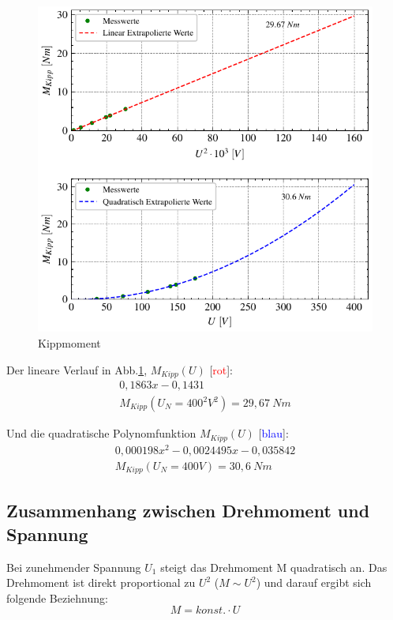 \documentclass[conference]{IEEEtran}
\begin{document}
\begin{figure}[htbp]
    \centering
    \includegraphics[width=\columnwidth]{./figures/kippmoment.pdf}
    \caption{Kippmoment}
    \label{fig:Kippmoment}
\end{figure}

Der lineare Verlauf in Abb.\ref{fig:Kippmoment}, $M_{\textit{Kipp}}(U)$ [\textcolor{red}{rot}]:
\begin{gather*}
    0,1863 x - 0,1431\\
    M_{Kipp}(U_N=400^2V^2)=29,67 \ \si{Nm}
\end{gather*}

Und die quadratische Polynomfunktion $M_{\textit{Kipp}}(U)$ [\textcolor{blue}{blau}]:
\begin{gather*}
    0,000198 x^2 - 0,0024495 x -0,035842\\
    M_{Kipp}(U_N=400V)=30,6\ \si{Nm}
\end{gather*}



\subsection{Zusammenhang zwischen Drehmoment und Spannung}

Bei zunehmender Spannung $U_1$ steigt das Drehmoment M quadratisch an. Das
Drehmoment ist direkt proportional zu $U^2$ ($M \sim U^2$) und darauf ergibt sich
folgende Beziehnung: \[ M = \textit{konst.} \cdot U \]
\end{document}
